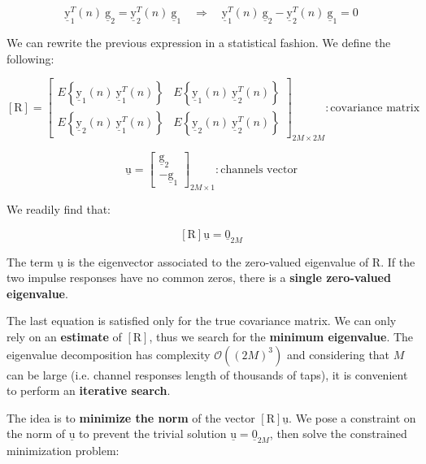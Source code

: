 \[
\underline{\mathrm{y}}_{1}^{T}(n) \ \underline{\mathrm{g}}_{2} = \underline{\mathrm{y}}_{2}^{T}(n) \ \underline{\mathrm{g}}_{1}
\quad \Rightarrow \quad
\underline{\mathrm{y}}_{1}^{T}(n) \ \underline{\mathrm{g}}_{2} - \underline{\mathrm{y}}_{2}^{T}(n) \ \underline{\mathrm{g}}_{1} = 0
\]

We can rewrite the previous expression in a statistical fashion.
We define the following:

\[
\left[ \mathrm{R} \right] =
\begin{bmatrix}
E\left\{ \underline{\mathrm{y}}_{1}(n) \ \underline{\mathrm{y}}_{1}^{T}(n) \right\} &
E\left\{ \underline{\mathrm{y}}_{1}(n) \ \underline{\mathrm{y}}_{2}^{T}(n) \right\} \\[8pt]
E\left\{ \underline{\mathrm{y}}_{2}(n) \ \underline{\mathrm{y}}_{1}^{T}(n) \right\} &
E\left\{ \underline{\mathrm{y}}_{2}(n) \ \underline{\mathrm{y}}_{2}^{T}(n) \right\}
\end{bmatrix}_{2M \times 2M}: \text{covariance matrix}
\]

\[
\underline{\mathrm{u}} =
\begin{bmatrix}
\underline{\mathrm{g}}_{2} \\
-\underline{\mathrm{g}}_{1}
\end{bmatrix}_{2M \times 1}: \text{channels vector}
\]

We readily find that:

\[
\left[ \mathrm{R} \right] \underline{\mathrm{u}} = \underline{0}_{2M}
\]

The term $\underline{\mathrm{u}}$ is the eigenvector associated to the zero-valued eigenvalue of $\mathrm{R}$.
If the two impulse responses have no common zeros, there is a \textbf{single zero-valued eigenvalue}.

The last equation is satisfied only for the true covariance matrix.
We can only rely on an \textbf{estimate} of $\left[\mathrm{R}\right]$, thus we search for the \textbf{minimum eigenvalue}.
The eigenvalue decomposition has complexity $\mathcal{O}\left( \left( 2M \right)^{3} \right)$ and considering that $M$ can be large (i.e. channel responses length of thousands of taps), it is convenient to perform an \textbf{iterative search}.

The idea is to \textbf{minimize the norm} of the vector $\left[\mathrm{R}\right] \underline{\mathrm{u}}$.  
We pose a constraint on the norm of $\underline{\mathrm{u}}$ to prevent the trivial solution $\underline{\mathrm{u}} = \underline{0}_{2M}$,  
then solve the constrained minimization problem:

